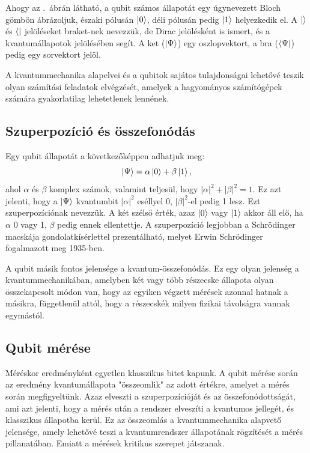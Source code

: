 \documentclass[
]{thesis-ekf}
\theoremstyle{definition}
\theoremstyle{remark}
\begin{document}
Ahogy az \az{\ref{fig:bitqubit}}.~ábrán látható, a qubit számos állapotát egy úgynevezett Bloch gömbön ábrázoljuk, északi pólusán $\ket{0}$, déli pólusán pedig $\ket{1}$ helyezkedik el. A $\ket{}$ és $\bra{}$ jelöléseket braket-nek nevezzük, de Dirac jelölésként is ismert, és a kvantumállapotok jelölésében segít. A ket ($\ket{\Psi}$) egy oszlopvektort, a bra ($\bra{\Psi}$) pedig egy sorvektort jelöl.

A kvantummechanika alapelvei és a qubitok sajátos tulajdonságai lehetővé teszik
olyan számítási feladatok elvégzését, amelyek a hagyományos számítógépek számára gyakorlatilag lehetetlenek lennének.

\subsection{Szuperpozíció és összefonódás}

Egy qubit állapotát a következőképpen adhatjuk meg:
\begin{equation}\label{qubitallapot}
	\ket{\Psi}=\alpha\ket{0}+\beta\ket{1},
\end{equation}
ahol $\alpha$ és $\beta$ komplex számok, valamint teljesül, hogy $|\alpha|^2+|\beta|^2=1$. Ez azt jelenti, hogy a $\ket{\Psi}$ kvantumbit $|\alpha|^2$ eséllyel 0, $|\beta|^2$-el pedig 1 lesz. Ezt szuperpozíciónak nevezzük. A két szélső érték, azaz $\ket{0}$ vagy $\ket{1}$ akkor áll elő, ha $\alpha$ 0 vagy 1, $\beta$ pedig ennek ellentettje. A szuperpozíció legjobban a Schrödinger macskája gondolatkísérlettel prezentálható, melyet Erwin Schrödinger fogalmazott meg 1935-ben.

A qubit másik fontos jelensége a kvantum-összefonódás. Ez egy olyan jelenség a kvantummechanikában, amelyben két vagy több részecske állapota olyan összekapcsolt módon van, hogy az egyiken végzett mérések azonnal hatnak a másikra, függetlenül attól, hogy a részecskék milyen fizikai távolságra vannak egymástól.

\subsection{Qubit mérése}
Méréskor eredményként egyetlen klasszikus bitet kapunk. A qubit mérése során az eredmény kvantumállapota "összeomlik" az adott értékre, amelyet a mérés során megfigyeltünk. Azaz elveszti a szuperpozícióját és az összefonódottságát, ami azt jelenti, hogy a mérés után a rendszer elveszíti a kvantumos jellegét, és klasszikus állapotba kerül. Ez az összeomlás a kvantummechanika alapvető jelensége, amely lehetővé teszi a kvantumrendszer állapotának rögzítését a mérés pillanatában. Emiatt a mérések kritikus szerepet játszanak.
\end{document}
